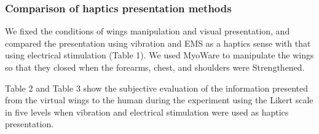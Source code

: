 \documentclass[letterpaper, 10 pt, conference]{ieeeconf}  %
\begin{document}
                \subsubsection{Comparison of haptics presentation methods}
                        We fixed the conditions of wings manipulation and visual presentation, and compared the presentation using vibration and EMS as a haptics sense with that using electrical stimulation (Table 1).  
                        We used MyoWare to manipulate the wings so that they closed when the forearms, chest, and shoulders were Strengthened.    

                        Table 2 and Table 3 show the subjective evaluation of the information presented from the virtual wings to the human during the experiment using the Likert scale in five levels when vibration and electrical stimulation were used as haptics presentation.  

                        \begin{table}[tb]
                                \begin{center}
                                    \caption{Results of an experiment using vibration as a haptics presentation}
                                \end{center}
                        \end{table}
                            
\end{document}

